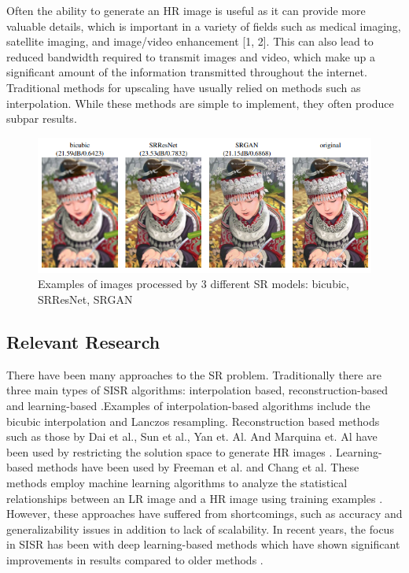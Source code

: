 \documentclass[11pt,titlepage]{article}
\begin{document}
Often the ability to generate an HR image is useful as it can provide more valuable details, which is important in a variety of fields such as medical imaging, satellite imaging, and image/video enhancement [1, 2]. This can also lead to reduced bandwidth required to transmit images and video, which make up a significant amount of the information transmitted throughout the internet. Traditional methods for upscaling have usually relied on methods such as interpolation. While these methods are simple to implement, they often produce subpar results. 

\begin{figure}[hp]
  \centering
  \includegraphics[width=\linewidth]{sr_examples.png}
  \caption{Examples of images processed by 3 different SR models: bicubic, SRResNet, SRGAN \cite{Ledig2017}}
  \label{fig:sr_eg}
\end{figure}

\subsection*{Relevant Research}

There have been many approaches to the SR problem. Traditionally there are three main types of SISR algorithms: interpolation based, reconstruction-based and learning-based \cite{Yang2019}.Examples of interpolation-based algorithms include the bicubic interpolation and Lanczos resampling. Reconstruction based methods such as those by Dai et al., Sun et al., Yan et. Al. And Marquina et. Al have been used by restricting the solution space to generate HR images \cite{Yang2019}. Learning-based methods have been used by Freeman et al. and Chang et al. These methods employ machine learning algorithms to analyze the statistical relationships between an LR image and a HR image using training examples \cite{Yang2019}. However, these approaches have suffered from shortcomings, such as accuracy and generalizability issues in addition to lack of scalability. In recent years, the focus in SISR has been with deep learning-based methods which have shown significant improvements in results compared to older methods \cite{Yang2019}.
\end{document}
